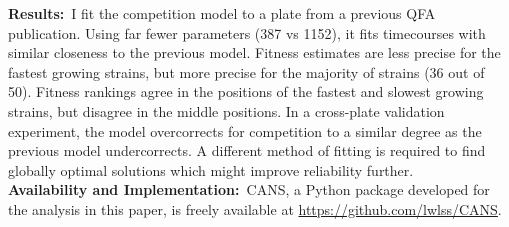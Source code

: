 \textbf{Results:}~I fit the competition model to a plate from a
previous QFA publication.
Using far fewer parameters (387 vs 1152), it fits timecourses with
similar closeness to the previous model.
Fitness estimates are less precise for the fastest growing strains,
but more precise for the majority of strains (36 out of 50). Fitness
rankings agree in the positions of the fastest and slowest growing
strains, but disagree in the middle positions.
In a cross-plate validation experiment,
the model overcorrects for competition to a similar degree as the
previous model undercorrects. A different method of fitting is
required to find globally optimal solutions which might improve
reliability further.
\\
\textbf{Availability and Implementation:}~CANS, a Python package
developed for the analysis in this paper, is freely available at
\href{https://github.com/lwlss/CANS}{https://github.com/lwlss/CANS}.
